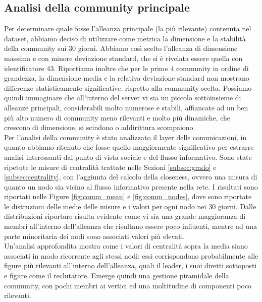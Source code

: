 \subsection{Analisi della community principale}
Per determinare quale fosse l'alleanza principale (la più rilevante) contenuta nel dataset, abbiamo deciso di utilizzare come metrica la dimensione e la stabilità della community sui 30 giorni. Abbiamo così scelto l'alleanza di dimensione massima e con minore deviazione standard, che si è rivelata essere quella con identificatore 43. Riportiamo inoltre che per le prime 4 community in ordine di grandezza, la dimensione media e la relativa deviazione standard non mostrano differenze statisticamente significative. rispetto alla community scelta. Possiamo quindi immaginare che all'interno del server vi sia un piccolo sottoinsieme di alleanze principali, considerabili molto numerose e stabili, affiancate ad un ben più alto numero di community meno rilevanti e molto più dinamiche, che crescono di dimensione, si scindono o addirittura scompaiono.\\
Per l'analisi della community è stato analizzato il layer delle comunicazioni, in quanto abbiamo ritenuto che fosse quello maggiormente significativo per estrarre analisi interessanti dal punto di vista sociale e del flusso informativo.
Sono state ripetute le misure di centralità trattate nelle Sezioni \ref{subsec:grado} e \ref{subsec:centrality}, con l'aggiunta del calcolo della closeness, ovvero una misura di quanto un nodo sia vicino al flusso informativo presente nella rete. I risultati sono riportati nelle Figure \ref{fig:comm_mean}  e \ref{fig:comm_nodes}, dove sono riportate le distruzioni delle medie delle misure e i valori per ogni nodo nei 30 giorni. Dalle distribuzioni riportare risulta evidente come vi sia una grande maggioranza di membri all'interno dell'alleanza che risultano essere poco influenti, mentre ad una parte minoritaria dei nodi sono associati valori più elevati.\\
Un'analisi approfondita mostra come i valori di centralità sopra la media siano associati in modo ricorrente agli stessi nodi: essi corrispondono probabilmente alle figure più rilevanti all'interno dell'alleanza, quali il leader, i suoi diretti sottoposti e figure come il reclutatore.
Emerge quindi una gestione piramidale della community, con pochi membri ai vertici ed una moltitudine di componenti poco rilevanti.
